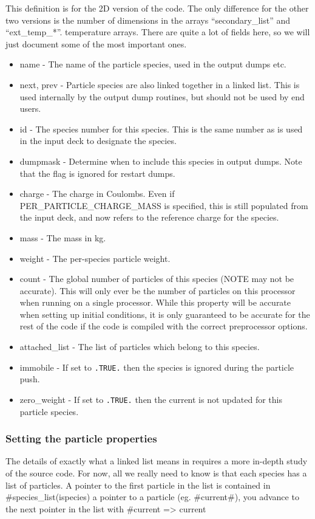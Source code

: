 This definition is for the 2D version of the code. The only difference for
the other two versions is the number of dimensions in the arrays
``secondary\_list'' and ``ext\_temp\_*''.
temperature arrays.
There are quite a lot of fields here, so we will just document some of the
most important ones.

\begin{itemize}
\item name - The name of the particle species, used in the output dumps etc.
\item next, prev - Particle species are also linked together in a linked
  list. This is used internally by the output dump routines, but should not be
  used by end users.
\item id - The species number for this species. This is the same number as is
  used in the input deck to designate the species.
\item dumpmask - Determine when to include this species in output
  dumps. Note that the flag is ignored for restart dumps.
\item charge - The charge in Coulombs. Even if PER\_PARTICLE\_CHARGE\_MASS is
  specified, this is still populated from the input deck, and now refers to
  the reference charge for the species.
\item mass - The mass in kg.
\item weight - The per-species particle weight.
\item count - The global number of particles of this species (NOTE may not
  be accurate). This will only ever be the number of particles on this
  processor when running on a single processor. While this property will be
  accurate when setting up initial conditions, it is only guaranteed to be
  accurate for the rest of the code if the code is compiled with the correct
  preprocessor options.
\item attached\_list - The list of particles which belong to this species.
\item immobile - If set to \verb|.TRUE.| then the species is ignored during
  the particle push.
\item zero\_weight - If set to \verb|.TRUE.| then the current is not updated
  for this particle species.
\end{itemize}


\subsubsection{Setting the particle properties}
The details of exactly what a linked list means in {\EPOCH} requires
a more in-depth study of the source code.
For now, all we really need to know is that each
species has a list of particles. A pointer to the first particle in the list
is contained in #species_list(ispecies)%
a pointer to a particle (eg. #current#), you advance to the next pointer in
the list with #current => current%

